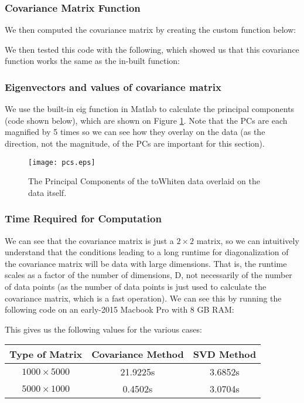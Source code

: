 \documentclass[11pt, oneside]{article}
\begin{document}
\subsubsection{Covariance Matrix Function}

We then computed the covariance matrix by creating the custom function below:

We then tested this code with the following, which showed us that this covariance function works the same as the in-built function:



\subsubsection{Eigenvectors and values of covariance matrix}

We use the built-in eig function in Matlab to calculate the principal components (code shown below), which are shown on Figure \ref{fig:PCs}. Note that the PCs are each magnified by 5 times so we can see how they overlay on the data (as the direction, not the magnitude, of the PCs are important for this section).


\begin{figure}[ht!]
\texttt{[image: pcs.eps]}
\caption{The Principal Components of the toWhiten data overlaid on the data itself.}
\label{fig:PCs}
\end{figure}

\subsubsection{Time Required for Computation}

We can see that the covariance matrix is just a $2 \times 2$ matrix, so we can intuitively understand that the conditions leading to a long runtime for diagonalization of the covariance matrix will be data with large dimensions. That is, the runtime scales as a factor of the number of dimensions, D, not necessarily of the number of data points (as the number of data points is just used to calculate the covariance matrix, which is a fast operation). We can see this by running the following code on an early-2015 Macbook Pro with 8 GB RAM:

This gives us the following values for the various cases:

\begin{tabular}{|c|c|c|}
\hline
Type of Matrix & Covariance Method & SVD Method \\
\hline
$ 1000 \times 5000$ & 21.9225s &  3.6852s \\
\hline
$ 5000 \times 1000$ & 0.4502s & 3.0704s \\
\hline
\end{tabular}
\end{document}

